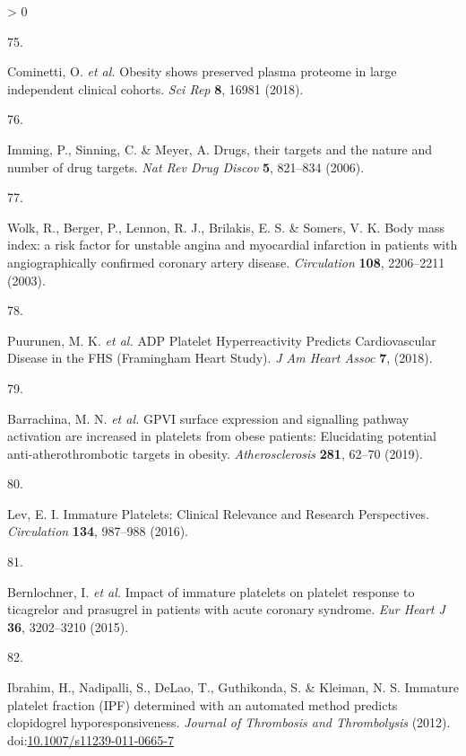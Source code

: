 \documentclass[11pt,twoside]{bristolthesis}
\newlength{\cslhangindent}
\newlength{\csllabelwidth}
\newenvironment{CSLReferences}[2] %
 {%
  \setlength{\parindent}{0pt}
  \ifodd #1 \everypar{\setlength{\hangindent}{\cslhangindent}}\ignorespaces\fi
  \ifnum #2 > 0
  \setlength{\parskip}{#2\baselineskip}
  \fi
 }%
 {}
\newcommand{\CSLLeftMargin}[1]{\parbox[t]{\csllabelwidth}{#1}}
\newcommand{\CSLRightInline}[1]{\parbox[t]{\linewidth - \csllabelwidth}{#1}\break}
\begin{document}
\begin{CSLReferences}{0}{0}
\leavevmode\hypertarget{ref-Cominetti2018}{}%
\CSLLeftMargin{75. }
\CSLRightInline{Cominetti, O. \emph{et al.} {Obesity shows preserved plasma proteome in large independent clinical cohorts}. \emph{Sci Rep} \textbf{8}, 16981 (2018).}

\leavevmode\hypertarget{ref-Imming2006}{}%
\CSLLeftMargin{76. }
\CSLRightInline{Imming, P., Sinning, C. \& Meyer, A. {Drugs, their targets and the nature and number of drug targets}. \emph{Nat Rev Drug Discov} \textbf{5}, 821--834 (2006).}

\leavevmode\hypertarget{ref-Wolk2003a}{}%
\CSLLeftMargin{77. }
\CSLRightInline{Wolk, R., Berger, P., Lennon, R. J., Brilakis, E. S. \& Somers, V. K. {Body mass index: a risk factor for unstable angina and myocardial infarction in patients with angiographically confirmed coronary artery disease}. \emph{Circulation} \textbf{108}, 2206--2211 (2003).}

\leavevmode\hypertarget{ref-Puurunen2018}{}%
\CSLLeftMargin{78. }
\CSLRightInline{Puurunen, M. K. \emph{et al.} {ADP Platelet Hyperreactivity Predicts Cardiovascular Disease in the FHS (Framingham Heart Study)}. \emph{J Am Heart Assoc} \textbf{7}, (2018).}

\leavevmode\hypertarget{ref-Barrachina2019}{}%
\CSLLeftMargin{79. }
\CSLRightInline{Barrachina, M. N. \emph{et al.} {GPVI surface expression and signalling pathway activation are increased in platelets from obese patients: Elucidating potential anti-atherothrombotic targets in obesity}. \emph{Atherosclerosis} \textbf{281}, 62--70 (2019).}

\leavevmode\hypertarget{ref-Lev2016a}{}%
\CSLLeftMargin{80. }
\CSLRightInline{Lev, E. I. {Immature Platelets: Clinical Relevance and Research Perspectives}. \emph{Circulation} \textbf{134}, 987--988 (2016).}

\leavevmode\hypertarget{ref-Bernlochner2015a}{}%
\CSLLeftMargin{81. }
\CSLRightInline{Bernlochner, I. \emph{et al.} {Impact of immature platelets on platelet response to ticagrelor and prasugrel in patients with acute coronary syndrome}. \emph{Eur Heart J} \textbf{36}, 3202--3210 (2015).}

\leavevmode\hypertarget{ref-Ibrahim2012}{}%
\CSLLeftMargin{82. }
\CSLRightInline{Ibrahim, H., Nadipalli, S., DeLao, T., Guthikonda, S. \& Kleiman, N. S. {Immature platelet fraction (IPF) determined with an automated method predicts clopidogrel hyporesponsiveness}. \emph{Journal of Thrombosis and Thrombolysis} (2012). doi:\href{https://doi.org/10.1007/s11239-011-0665-7}{10.1007/s11239-011-0665-7}}


\end{CSLReferences}
\end{document}

